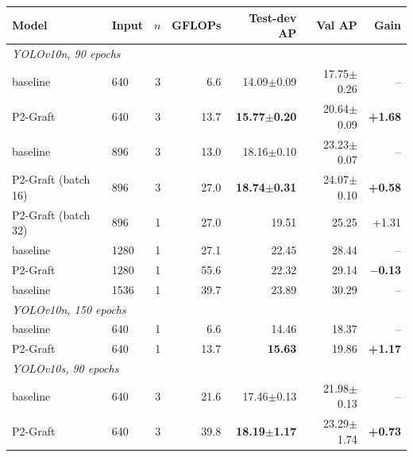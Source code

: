 \begin{tabular}{llrrrrr}
\toprule
Model & Input & $n$ & GFLOPs & Test-dev AP & Val AP & Gain \\
\midrule
\multicolumn{7}{l}{\textit{YOLOv10n, 90 epochs}} \\
baseline & 640 & 3 & 6.6 & 14.09$\pm$0.09 & 17.75$\pm$0.26 & -- \\
P2-Graft & 640 & 3 & 13.7 & \textbf{15.77$\pm$0.20} & 20.64$\pm$0.09 & \textbf{+1.68} \\
\addlinespace[1pt]
baseline & 896 & 3 & 13.0 & 18.16$\pm$0.10 & 23.23$\pm$0.07 & -- \\
P2-Graft (batch 16) & 896 & 3 & 27.0 & \textbf{18.74$\pm$0.31} & 24.07$\pm$0.10 & \textbf{+0.58} \\
P2-Graft (batch 32) & 896 & 1 & 27.0 & 19.51 & 25.25 & +1.31 \\
\addlinespace[1pt]
baseline & 1280 & 1 & 27.1 & 22.45 & 28.44 & -- \\
P2-Graft & 1280 & 1 & 55.6 & 22.32 & 29.14 & \textbf{$-$0.13} \\
\addlinespace[1pt]
baseline & 1536 & 1 & 39.7 & 23.89 & 30.29 & -- \\
\midrule
\multicolumn{7}{l}{\textit{YOLOv10n, 150 epochs}} \\
baseline & 640 & 1 & 6.6 & 14.46 & 18.37 & -- \\
P2-Graft & 640 & 1 & 13.7 & \textbf{15.63} & 19.86 & \textbf{+1.17} \\
\midrule
\multicolumn{7}{l}{\textit{YOLOv10s, 90 epochs}} \\
baseline & 640 & 3 & 21.6 & 17.46$\pm$0.13 & 21.98$\pm$0.13 & -- \\
P2-Graft & 640 & 3 & 39.8 & \textbf{18.19$\pm$1.17} & 23.29$\pm$1.74 & \textbf{+0.73} \\
\bottomrule
\end{tabular}